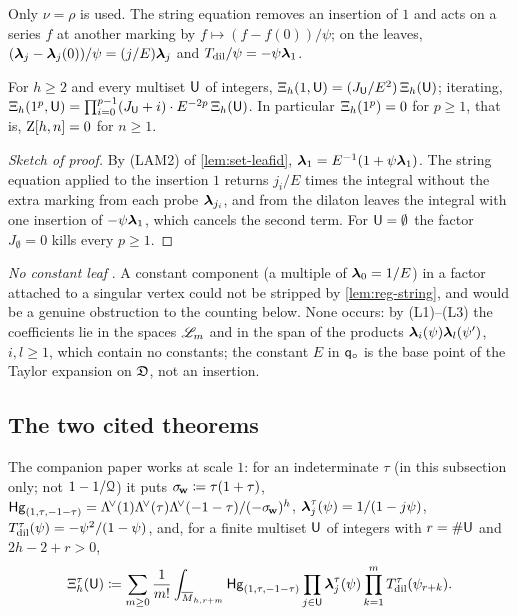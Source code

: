 Only $\nu=\rho$ is used. The string equation removes an insertion of $1$ and acts on a series $f$ at another marking by $f\mapsto(f-f(0))/\psi$; on the leaves, $(\boldsymbol{\lambda}_j-\boldsymbol{\lambda}_j(0))/\psi=(j/E)\boldsymbol{\lambda}_j$ and $T_{\mathrm{dil}}/\psi=-\psi\boldsymbol{\lambda}_1$.

\begin{lem}
\label{lem:reg-string}
For $h\geq2$ and every multiset $\mathsf{U}$ of integers, $\Xi_h(1,\mathsf{U})=(J_{\mathsf{U}}/E^2)\,\Xi_h(\mathsf{U})$; iterating, $\Xi_h(1^p,\mathsf{U})=\prod_{i=0}^{p-1}(J_{\mathsf{U}}+i)\cdot E^{-2p}\,\Xi_h(\mathsf{U})$. In particular $\Xi_h(1^p)=0$ for $p\geq1$, that is, $\mathrm{Z}[h,n]=0$ for $n\geq1$.
\end{lem}

\begin{proof}[Sketch of proof]
By (LAM2) of \cref{lem:set-leafid}, $\boldsymbol{\lambda}_1=E^{-1}(1+\psi\boldsymbol{\lambda}_1)$. The string equation applied to the insertion $1$ returns $j_i/E$ times the integral without the extra marking from each probe $\boldsymbol{\lambda}_{j_i}$, and from the dilaton leaves the integral with one insertion of $-\psi\boldsymbol{\lambda}_1$, which cancels the second term. For $\mathsf{U}=\emptyset$ the factor $J_\emptyset=0$ kills every $p\geq1$.
\end{proof}

\emph{No constant leaf} . A constant component (a multiple of $\boldsymbol{\lambda}_0=1/E$) in a factor attached to a singular vertex could not be stripped by \cref{lem:reg-string}, and would be a genuine obstruction to the counting below. None occurs: by (L1)--(L3) the coefficients lie in the spaces $\mathscr{L}_m$ and in the span of the products $\boldsymbol{\lambda}_i(\psi)\boldsymbol{\lambda}_l(\psi')$, $i,l\geq1$, which contain no constants; the constant $E$ in $\mathsf{q}_{\circ}$ is the base point of the Taylor expansion on $\mathfrak{D}$, not an insertion.

\subsection{The two cited theorems}
\label{sec:reg-cited}

The companion paper \cite{LP2} works at scale $1$: for an indeterminate $\tau$ (in this subsection only; not $1-1/\mathcal{Q}$) it puts $\sigma_{\!\mathbf{w}}\coloneqq\tau(1+\tau)$, $\mathsf{Hg}_{(1,\tau,-1-\tau)}=\Lambda^{\!\vee}(1)\Lambda^{\!\vee}(\tau)\Lambda^{\!\vee}(-1-\tau)/(-\sigma_{\!\mathbf{w}})^h$, $\boldsymbol{\lambda}^\tau_j(\psi)=1/(1-j\psi)$, $T_{\mathrm{dil}}^\tau(\psi)=-\psi^2/(1-\psi)$, and, for a finite multiset $\mathsf{U}$ of integers with $r=\#\mathsf{U}$ and $2h-2+r>0$,
\[
\Xi^{\tau}_h(\mathsf{U})\coloneqq\sum_{m\geq0}\frac1{m!}\int_{\overline{M}_{h,r+m}}\mathsf{Hg}_{(1,\tau,-1-\tau)}\prod_{j\in\mathsf{U}}\boldsymbol{\lambda}^\tau_j(\psi)\prod_{k=1}^{m}T_{\mathrm{dil}}^\tau(\psi_{r+k}).
\]

